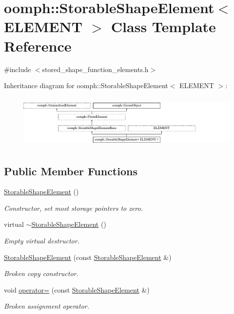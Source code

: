 \hypertarget{classoomph_1_1StorableShapeElement}{}\section{oomph\+:\+:Storable\+Shape\+Element$<$ E\+L\+E\+M\+E\+NT $>$ Class Template Reference}
\label{classoomph_1_1StorableShapeElement}


{\ttfamily \#include $<$stored\+\_\+shape\+\_\+function\+\_\+elements.\+h$>$}

Inheritance diagram for oomph\+:\+:Storable\+Shape\+Element$<$ E\+L\+E\+M\+E\+NT $>$\+:\begin{figure}[H]
\begin{center}
\leavevmode
\includegraphics[height=2.745098cm]{classoomph_1_1StorableShapeElement}
\end{center}
\end{figure}
\subsection*{Public Member Functions}
\begin{DoxyCompactItemize}
\item 
\hyperlink{classoomph_1_1StorableShapeElement_a80c9e4c6b6b908eeec3fa1f2460ed412}{Storable\+Shape\+Element} ()
\begin{DoxyCompactList}\small\item\em Constructor, set most storage pointers to zero. \end{DoxyCompactList}\item 
virtual \hyperlink{classoomph_1_1StorableShapeElement_a86e2b5ec64139ef93c4f3397b4a60771}{$\sim$\+Storable\+Shape\+Element} ()
\begin{DoxyCompactList}\small\item\em Empty virtual destructor. \end{DoxyCompactList}\item 
\hyperlink{classoomph_1_1StorableShapeElement_ac242bdf9fd1206f017038216fdce37eb}{Storable\+Shape\+Element} (const \hyperlink{classoomph_1_1StorableShapeElement}{Storable\+Shape\+Element} \&)
\begin{DoxyCompactList}\small\item\em Broken copy constructor. \end{DoxyCompactList}\item 
void \hyperlink{classoomph_1_1StorableShapeElement_a3436eabded443d3746be5c50daabe603}{operator=} (const \hyperlink{classoomph_1_1StorableShapeElement}{Storable\+Shape\+Element} \&)
\begin{DoxyCompactList}\small\item\em Broken assignment operator. \end{DoxyCompactList}\end{DoxyCompactItemize}
